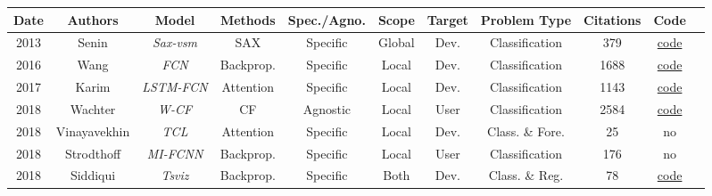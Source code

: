 
\begin{table*}[h!]
  \centering
  \begin{tabular}{@{}ccccccccccc@{}}
    \toprule
    Date        &   Authors                         & Model             & Methods       & Spec./Agno.   & Scope         & Target  & Problem Type                      & Citations         & Code \\
    \midrule

    2013        & Senin\cite{senin_sax-vsm_2013}             &\textit{Sax-vsm}   & SAX           & Specific      & Global        & Dev.      & Classification                    & 379               & \href{https://github.com/jMotif/sax-vsm_classic}{code}\\ 
    
    2016        &   Wang \cite{wang_time_2016}        & \textit{FCN}      & Backprop.     & Specific      & Local         & Dev.      & Classification                    & 1688              & \href{https://github.com/cauchyturing/UCR_Time_Series_Classification_Deep_Learning_Baseline}{code}\\ 

    2017        & Karim\cite{karim_multivariate_2019}             &\textit{\footnotesize{LSTM-FCN}} & Attention     &Specific       & Local         & Dev.      & Classification                    & 1143              & \href{https://github.com/houshd/LSTM-FCN}{code}\\ 

    2018        & Wachter\cite{wachter_counterfactual_2018} & \textit{W-CF} & CF    & Agnostic      & Local         & User      & Classification & 2584 & \href{https://github.com/e-delaney/Instance-Based_CFE_TSC/tree/main/W-CF}{code}\\

    2018        & Vinayavekhin\cite{vinayavekhin_focusing_2018} &\textit{TCL}& Attention &Specific        & Local         & Dev.      & Class. \& Fore.                           & 25                & no\\  

    2018        & Strodthoff\cite{strodthoff_detecting_2019}  &\textit{\footnotesize{MI-FCNN}}   & Backprop.     &Specific       & Local         & User   & Classification                    & 176               & no\\ 

    2018        & Siddiqui\cite{siddiqui_tsviz_2019}       &\textit{Tsviz}     & Backprop.     &Specific       & Both          & Dev.      & Class. \& Reg.                    & 78                & \href{https://github.com/shoaibahmed/TSViz-Core}{code}\\


\end{tabular}
\end{table*}
